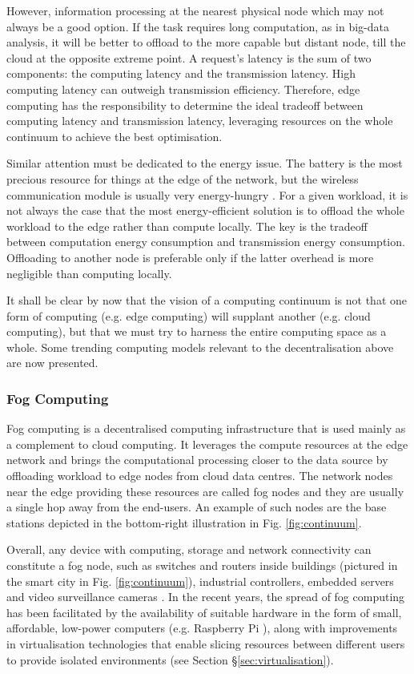 However, information processing at the nearest physical node which may not always be a good option. If the task requires long computation, as in big-data analysis, it will be better to offload to the more capable but distant node, till the cloud at the opposite extreme point. A request's latency is the sum of two components: the computing latency and the transmission latency. High computing latency can outweigh transmission efficiency. Therefore, edge computing has the responsibility to determine the ideal tradeoff between computing latency and transmission latency, leveraging resources on the whole continuum to achieve the best optimisation.

Similar attention must be dedicated to the energy issue. The battery is the most precious resource for things at the edge of the network, but the wireless communication module is usually very energy-hungry \cite{edge-computing-vision-challenges}. For a given workload, it is not always the case that the most energy-efficient solution is to offload the whole workload to the edge rather than compute locally. The key is the tradeoff between computation energy consumption and transmission energy consumption. Offloading to another node is preferable only if the latter overhead is more negligible than computing locally.

It shall be clear by now that the vision of a computing continuum is not that one form of computing (e.g. edge computing) will supplant another (e.g. cloud computing), but that we must try to harness the entire computing space as a whole. Some trending computing models relevant to the decentralisation above are now presented.

\subsubsection{Fog Computing}

Fog computing \cite{fog-computing} is a decentralised computing infrastructure that is used mainly as a complement to cloud computing. It leverages the compute resources at the edge network and brings the computational processing closer to the data source by offloading workload to edge nodes from cloud data centres. The network nodes near the edge providing these resources are called fog nodes and they are usually a single hop away from the end-users. An example of such nodes are the base stations depicted in the bottom-right illustration in Fig. \ref{fig:continuum}.

Overall, any device with computing, storage and network connectivity can constitute a fog node, such as switches and routers inside buildings (pictured in the smart city in Fig. \ref{fig:continuum}), industrial controllers, embedded servers and video surveillance cameras \cite{camera-virtualisation}. In the recent years, the spread of fog computing has been facilitated by the availability of suitable hardware in the form of small, affordable, low-power computers (e.g. Raspberry Pi \cite{raspberry}), along with improvements in virtualisation technologies that enable slicing resources between different users to provide isolated environments (see Section §\ref{sec:virtualisation}).

